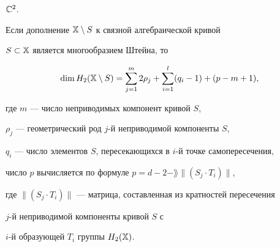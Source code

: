 $\Bbb C^2$.





\begin{lem}


Если дополнение $\Bbb X\setminus S$ к связной алгебраической кривой


$S\subset\Bbb X$ является многообразием Штейна, то


\begin{equation}


\label{oksa}


\dim H_2(\Bbb X\setminus S)


= \sum\limits_{j=1}^m 2\rho_j +\sum\limits_{i=1}^l (q_i-1) + (p-m+1),


\end{equation}


где $m$ --- число неприводимых компонент кривой $S$,


$\rho_j$ --- геометрический род $j$-й неприводимой компоненты $S$,


$q_i$ --- число элементов $S$, пересекающихся в $i$-й точке самопересечения,


число $p$ вычисляется по формуле $p= d-2 - \rang \|(S_j\cdot T_i)\|$,


где $\|(S_j\cdot T_i)\|$ --- матрица, составленная из кратностей пересечения


$j$-й неприводимой компоненты кривой $S$ с


$i$-й образующей $T_i$ группы $H_2(\Bbb X)$.


\end{lem}





